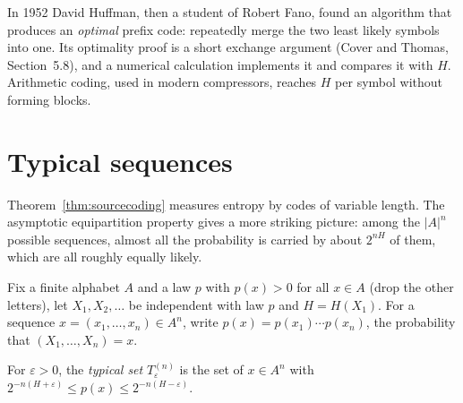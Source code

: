 \begin{remark}
In 1952 David Huffman, then a student of Robert Fano, found an algorithm that produces an \emph{optimal} prefix code:
repeatedly merge the two least likely symbols into one. Its optimality proof is a short exchange argument (Cover and
Thomas, Section~5.8), and a numerical calculation implements it and compares it with $H$. Arithmetic coding, used in modern
compressors, reaches $H$ per symbol without forming blocks.
\end{remark}

\section{Typical sequences}

Theorem~\ref{thm:sourcecoding} measures entropy by codes of variable length. The asymptotic equipartition property gives
a more striking picture: among the $|A|^n$ possible sequences, almost all the probability is carried by about $2^{nH}$ of
them, which are all roughly equally likely.

Fix a finite alphabet $A$ and a law $p$ with $p(x)>0$ for all $x\in A$ (drop the other letters), let $X_1,X_2,\ldots$ be
independent with law $p$ and $H=H(X_1)$. For a sequence $x=(x_1,\dots,x_n)\in A^n$, write $p(x)=p(x_1)\cdots p(x_n)$, the probability
that $(X_1,\dots,X_n)=x$.

\begin{definition}
For $\varepsilon>0$, the \emph{typical set} $T_\varepsilon^{(n)}$ is the set of $x\in A^n$ with $2^{-n(H+\varepsilon)}\le p(x)\le2^{-n(H-\varepsilon)}$.
\end{definition}

